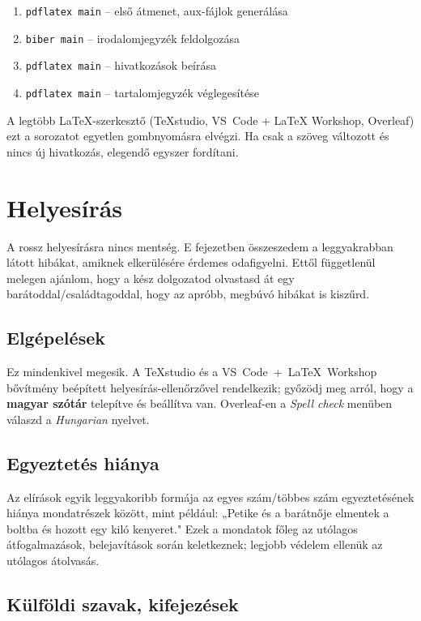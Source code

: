 \begin{enumerate}[noitemsep]
  \item \texttt{pdflatex main} -- első átmenet, aux-fájlok generálása
  \item \texttt{biber main} -- irodalomjegyzék feldolgozása
  \item \texttt{pdflatex main} -- hivatkozások beírása
  \item \texttt{pdflatex main} -- tartalomjegyzék véglegesítése
\end{enumerate}

A legtöbb \LaTeX-szerkesztő (TeXstudio, VS~Code + LaTeX Workshop, Overleaf)
ezt a sorozatot egyetlen gombnyomásra elvégzi. Ha csak a szöveg változott és
nincs új hivatkozás, elegendő egyszer fordítani.

\section{Helyesírás}

A rossz helyesírásra nincs mentség. E fejezetben összeszedem a leggyakrabban
látott hibákat, amiknek elkerülésére érdemes odafigyelni. Ettől függetlenül
melegen ajánlom, hogy a kész dolgozatod olvastasd át egy
barátoddal/családtagoddal, hogy az apróbb, megbúvó hibákat is kiszűrd.

\subsection{Elgépelések}

Ez mindenkivel megesik. A TeXstudio és a VS~Code~+~LaTeX~Workshop bővítmény
beépített helyesírás-ellenőrzővel rendelkezik; győzödj meg arról, hogy a
\textbf{magyar szótár} telepítve és beállítva van. Overleaf-en a
\textit{Spell check} menüben válaszd a \textit{Hungarian} nyelvet.

\subsection{Egyeztetés hiánya}

Az elírások egyik leggyakoribb formája az egyes szám/többes szám
egyeztetésének hiánya mondatrészek között, mint például: „Petike és a
barátnője elmentek a boltba és hozott egy kiló kenyeret." Ezek a mondatok
főleg az utólagos átfogalmazások, belejavítások során keletkeznek; legjobb
védelem ellenük az utólagos átolvasás.

\subsection{Külföldi szavak, kifejezések}

